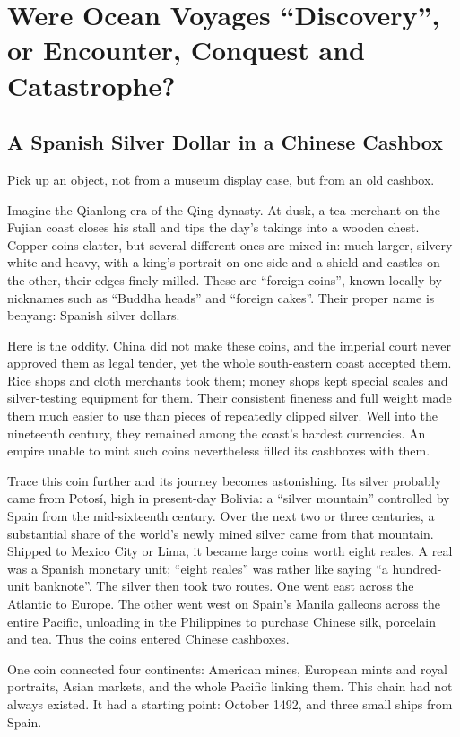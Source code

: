 \chapter[Discovery, Encounter and Conquest]{Were Ocean Voyages ``Discovery'', or Encounter, Conquest and Catastrophe?}
\section[A Spanish Dollar in China]{A Spanish Silver Dollar in a Chinese Cashbox}
Pick up an object, not from a museum display case, but from an old cashbox.

Imagine the Qianlong era of the Qing dynasty. At dusk, a tea merchant on the Fujian coast closes his stall and tips the day's takings into a wooden chest. Copper coins clatter, but several different ones are mixed in: much larger, silvery white and heavy, with a king's portrait on one side and a shield and castles on the other, their edges finely milled. These are ``foreign coins'', known locally by nicknames such as ``Buddha heads'' and ``foreign cakes''. Their proper name is benyang: Spanish silver dollars.

Here is the oddity. China did not make these coins, and the imperial court never approved them as legal tender, yet the whole south-eastern coast accepted them. Rice shops and cloth merchants took them; money shops kept special scales and silver-testing equipment for them. Their consistent fineness and full weight made them much easier to use than pieces of repeatedly clipped silver. Well into the nineteenth century, they remained among the coast's hardest currencies. An empire unable to mint such coins nevertheless filled its cashboxes with them.

Trace this coin further and its journey becomes astonishing. Its silver probably came from Potosí, high in present-day Bolivia: a ``silver mountain'' controlled by Spain from the mid-sixteenth century. Over the next two or three centuries, a substantial share of the world's newly mined silver came from that mountain. Shipped to Mexico City or Lima, it became large coins worth eight reales. A real was a Spanish monetary unit; ``eight reales'' was rather like saying ``a hundred-unit banknote''. The silver then took two routes. One went east across the Atlantic to Europe. The other went west on Spain's Manila galleons across the entire Pacific, unloading in the Philippines to purchase Chinese silk, porcelain and tea. Thus the coins entered Chinese cashboxes.

One coin connected four continents: American mines, European mints and royal portraits, Asian markets, and the whole Pacific linking them. This chain had not always existed. It had a starting point: October 1492, and three small ships from Spain.

